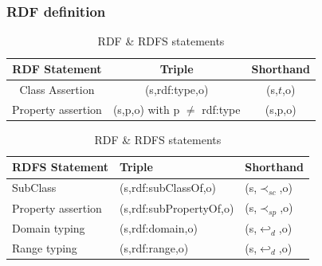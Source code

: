 \documentclass{beamer}
\numberwithin{figure}{section}
\numberwithin{equation}{section}
\begin{document}
\section{}
\begin{frame}
 \frametitle{RDF definition}
  \begin{table}[htbp]
		\centering
        \resizebox{10 cm}{!} {
			\begin{tabular}{|c|c|c|}
			\hline
			 RDF Statement & Triple & Shorthand \\
			\hline \hline 
			Class Assertion & (s,rdf:type,o)&(s,$t$,o) \\ 
            Property assertion & (s,p,o) with p $\not=$ rdf:type & (s,p,o) \\ \hline
			\end{tabular}

			\begin{tabular}{|l|l|l|}
			\hline
			 RDFS Statement & Triple & Shorthand \\
			\hline \hline 
			SubClass & (s,rdf:subClassOf,o)&(s,$\prec_{sc}$,o) \\ 
            Property assertion & (s,rdf:subPropertyOf,o) & (s,$\prec_{sp}$,o) \\ 
            Domain typing & (s,rdf:domain,o) & (s,$\hookleftarrow_{d}$,o) \\ 
            Range typing & (s,rdf:range,o) & (s,$\hookleftarrow_{d}$,o) \\ \hline
			\end{tabular}
            }
        \caption{\scriptsize RDF \& RDFS statements}
		\label{RDFstatements}
	\end{table}


\end{frame}
\end{document}
